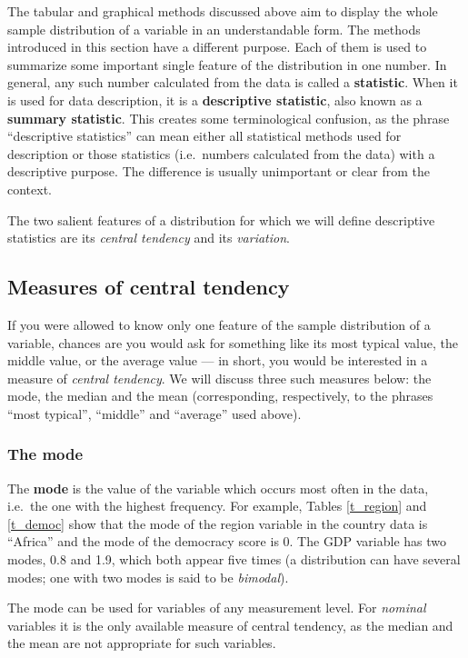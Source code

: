 \label{p_statistic}
The tabular and graphical methods discussed above aim to display the
whole sample distribution of a variable in an understandable form. The
methods introduced in this section have a different purpose. Each of
them is used to summarize some important single feature of the
distribution in one number. In general, any such number calculated from
the data is called a \textbf{statistic}. When it is used
for data description, it is a \textbf{descriptive statistic}, also known
as a \textbf{summary statistic}. This creates some terminological
confusion, as the phrase ``descriptive statistics'' can mean either all
statistical methods used for description or those statistics (i.e.\
numbers calculated from the data) with a descriptive purpose. The
difference is usually unimportant or clear from the context.

The two salient features of a distribution for which we will define
descriptive statistics are its \emph{central tendency} and its
\emph{variation}.

\subsection{Measures of central tendency}
\label{ss_descr1_nums_central}

If you were allowed to know only one feature of the sample distribution of a
variable, chances are you would ask for something like its most typical
value, the middle value, or the average value  --- in short, you would
be interested in a measure of \emph{central tendency}. We will discuss
three such measures below: the mode, the median and the mean
(corresponding, respectively, to the phrases ``most typical'',
``middle'' and ``average'' used above).

\subsubsection{The mode}

The \textbf{mode} is the value of the variable which occurs most
often in the data, i.e.\ the one with the highest frequency. For
example, Tables \ref{t_region} and \ref{t_democ} show that the mode of
the region variable in the country data is ``Africa'' and the mode of
the democracy score is 0. The GDP variable has two modes, 0.8 and 1.9,
which both appear five times (a distribution can have
several modes; one with two modes is said to be \emph{bimodal}).

The mode can be used for variables of any measurement level. For
\emph{nominal} variables it is the only available measure of central
tendency, as the median and the mean are not appropriate for such
variables.

